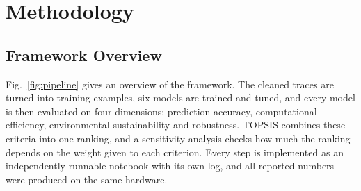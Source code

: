 \documentclass[conference,letterpaper,10pt]{IEEEtran}
\begin{document}
\section{Methodology}
\label{sec:method}

\subsection{Framework Overview}
Fig.~\ref{fig:pipeline} gives an overview of the framework. The cleaned traces are turned into training examples, six models are trained and tuned, and every model is then evaluated on four dimensions: prediction accuracy, computational efficiency, environmental sustainability and robustness. TOPSIS combines these criteria into one ranking, and a sensitivity analysis checks how much the ranking depends on the weight given to each criterion. Every step is implemented as an independently runnable notebook with its own log, and all reported numbers were produced on the same hardware.
\end{document}

